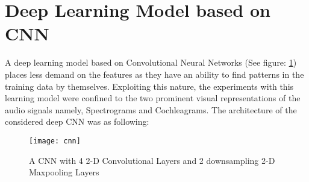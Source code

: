 \section{Deep Learning Model based on CNN}
A deep learning model based on Convolutional Neural Networks (See figure: \ref{fig:cnn}) places less demand on the features as they have an ability to find patterns in the training data by themselves. Exploiting this nature, the experiments with this learning model were confined to the two prominent visual representations of the audio signals namely, Spectrograms and Cochleagrams. The architecture of the considered deep CNN was as following:
\begin{figure}[!htbp]
\centering
\texttt{[image: cnn]}
\caption{A CNN with 4 2-D Convolutional Layers and 2 downsampling 2-D Maxpooling Layers}
\label{fig:cnn}
\end{figure}
